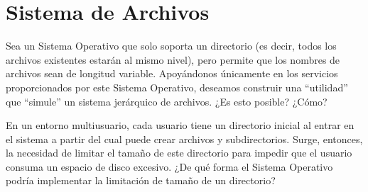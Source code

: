 \section{Sistema de Archivos}

\begin{ejercicio}
Sea un Sistema Operativo que solo soporta un directorio (es decir, todos los archivos existentes estarán
al mismo nivel), pero permite que los nombres de archivos sean de longitud variable.
Apoyándonos únicamente en los servicios proporcionados por este Sistema Operativo, deseamos construir una 
``utilidad'' que ``simule'' un sistema jerárquico de archivos. ¿Es esto posible? ¿Cómo?
\end{ejercicio}

\begin{ejercicio}
En un entorno multiusuario, cada usuario tiene un directorio inicial al entrar en el sistema a
partir del cual puede crear archivos y subdirectorios. Surge, entonces, la necesidad de limitar el tamaño
de este directorio para impedir que el usuario consuma un espacio de disco excesivo.
¿De qué forma el Sistema Operativo podría implementar la limitación de tamaño de un directorio?
\end{ejercicio}

